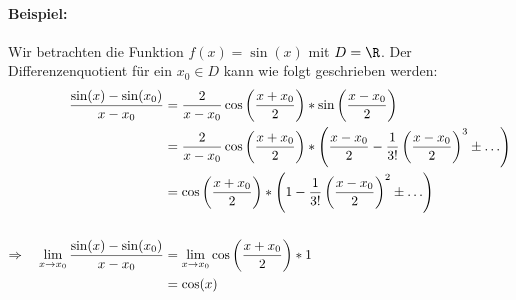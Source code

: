 \paragraph{Beispiel:}
Wir betrachten die Funktion $f(x)=\sin(x)$ mit $D=\R$. Der Differenzenquotient für ein $x_0\in D$ kann wie folgt geschrieben werden:
\begin{align*}
	\frac{\sin(x)-\sin(x_0)}{x-x_0}&=\frac{2}{x-x_0}\cos\left(\frac{x+x_0}{2}\right)*\sin\left(\frac{x-x_0}{2}\right)\\
	&=\frac{2}{x-x_0}\cos\left(\frac{x+x_0}{2}\right)*\left(\frac{x-x_0}{2}-\frac{1}{3!}\left(\frac{x-x_0}{2}\right)^3\pm\ldots\right)\\
	&=\cos\left(\frac{x+x_0}{2}\right)*\left(1-\frac{1}{3!}\left(\frac{x-x_0}{2}\right)^2\pm\ldots\right)\\
	\vspace{1em}\\
	\Rightarrow\quad \lim\limits_{x\to x_0}\frac{\sin(x)-\sin(x_0)}{x-x_0}&=\lim\limits_{x\to x_0} \cos\left(\frac{x+x_0}{2}\right)*1\\
	&=\cos(x)
\end{align*}

